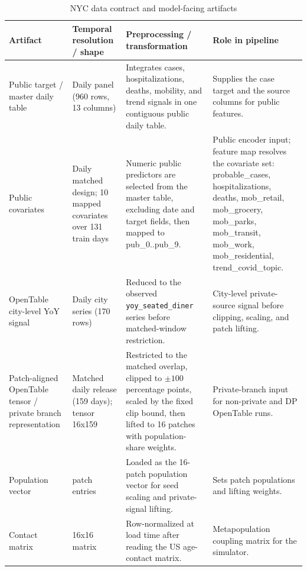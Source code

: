 \begin{table}[!htbp]
\centering
\footnotesize
\begin{threeparttable}
\caption{NYC data contract and model-facing artifacts}
\label{tab:data_contract}
\begin{tabularx}{\textwidth}{>{\raggedright\arraybackslash}p{}>{\raggedright\arraybackslash}p{}>{\raggedright\arraybackslash}p{}>{\raggedright\arraybackslash}X}
\toprule
Artifact & Temporal resolution / shape & Preprocessing / transformation & Role in pipeline \\
\midrule
Public target / master daily table & Daily panel (960 rows, 13 columns) & Integrates cases, hospitalizations, deaths, mobility, and trend signals in one contiguous public daily table. & Supplies the case target and the source columns for public features. \\
Public covariates & Daily matched design; 10 mapped covariates over 131 train days & Numeric public predictors are selected from the master table, excluding date and target fields, then mapped to pub\_0..pub\_9. & Public encoder input; feature map resolves the covariate set: probable\_cases, hospitalizations, deaths, mob\_retail, mob\_grocery, mob\_parks, mob\_transit, mob\_work, mob\_residential, trend\_covid\_topic. \\
OpenTable city-level YoY signal & Daily city series (170 rows) & Reduced to the observed \texttt{yoy\_seated\_diner} series before matched-window restriction. & City-level private-source signal before clipping, scaling, and patch lifting. \\
Patch-aligned OpenTable tensor / private branch representation & Matched daily release (159 days); tensor 16x159 & Restricted to the matched overlap, clipped to \(\pm 100\) percentage points, scaled by the fixed clip bound, then lifted to 16 patches with population-share weights. & Private-branch input for non-private and DP OpenTable runs. \\
Population vector & 16 patch entries & Loaded as the 16-patch population vector for seed scaling and private-signal lifting. & Sets patch populations and lifting weights. \\
Contact matrix & 16x16 matrix & Row-normalized at load time after reading the US age-contact matrix. & Metapopulation coupling matrix for the simulator. \\
\bottomrule
\end{tabularx}
\end{threeparttable}
\end{table}

